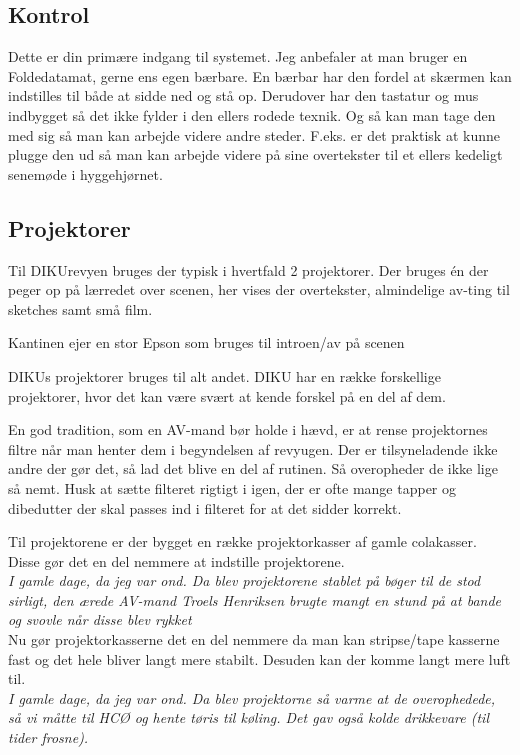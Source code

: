 \documentclass[10pt,a4paper,danish]{article}
\begin{document}
\subsection{Kontrol}
Dette er din primære indgang til systemet. Jeg anbefaler at man bruger en
Foldedatamat, gerne ens egen bærbare.
En bærbar har den fordel at skærmen kan indstilles til både at sidde ned og stå
op. Derudover har den tastatur og mus indbygget så det ikke fylder i den ellers
rodede texnik. Og så kan man tage den med sig så man kan arbejde videre andre
steder. F.eks. er det praktisk at kunne plugge den ud så man kan arbejde videre
på sine overtekster til et ellers kedeligt senemøde i hyggehjørnet.


\subsection{Projektorer}
Til DIKUrevyen bruges der typisk i hvertfald 2 projektorer.
Der bruges én der peger op på lærredet over scenen, her vises der overtekster,
almindelige av-ting til sketches samt små film.

Kantinen ejer en stor Epson som bruges til introen/av på scenen

DIKUs projektorer bruges til alt andet.
DIKU har en række forskellige projektorer, hvor det kan være svært at kende
forskel på en del af dem.

En god tradition, som en AV-mand bør holde i hævd, er at rense projektornes filtre
når man henter dem i begyndelsen af revyugen.
Der er tilsyneladende ikke andre der gør det, så lad det blive en del af
rutinen. Så overopheder de ikke lige så nemt.
Husk at sætte filteret rigtigt i igen, der er ofte mange tapper og dibedutter
der skal passes ind i filteret for at det sidder korrekt.


Til projektorene er der bygget en række projektorkasser af gamle colakasser.
Disse gør det en del nemmere at indstille projektorene.\\
\textit{I gamle dage, da jeg var ond. Da blev projektorene stablet på bøger til
  de stod sirligt, den ærede AV-mand Troels Henriksen brugte mangt en stund på
  at bande og svovle når disse blev rykket}\\
Nu gør projektorkasserne det en del nemmere da man kan stripse/tape kasserne
fast og det hele bliver langt mere stabilt.
Desuden kan der komme langt mere luft til.\\
\textit{I gamle dage, da jeg var ond. Da blev projektorne så varme at de
  overophedede, så vi måtte til HCØ og hente tøris til køling. Det gav også
  kolde drikkevare (til tider frosne).}
\end{document}
